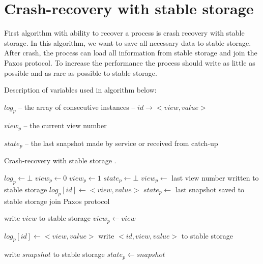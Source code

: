 \section{Crash-recovery with stable storage}
\label{sec:full_ss}

First algorithm with ability to recover a process is crash recovery with stable storage. In this algorithm, we want to save all necessary data to stable storage. After crash, the process can load all information from stable storage and join the Paxos protocol. \linebreak To increase the performance the process should write as little as possible and as rare as possible to stable storage.

Description of variables used in algorithm below:
\begin{tightList}[\setlength{\labelwidth}{20em} \setlength{\leftmargin}{2\leftmargin}]
  \item[$log_p$] -- the array of consecutive instances -- $id \rightarrow <view, value>$
  \item[$view_p$] -- the current view number
  \item[$state_p$] -- the last snapshot made by service or received from catch-up
\end{tightList}

\begin{algorithm}
  \caption{Crash-recovery with stable storage \protect\cite{Nun10}.}
  \begin{algorithmic}[1]
    \INIT{}
      \STATE $log_p \leftarrow \bot$ %
      \STATE $view_p \leftarrow 0$
        \STATE $view_p \leftarrow 1$
      \ENDIF
      \STATE $state_p \leftarrow \bot$ %
      \STATE
        \STATE $view_p \leftarrow$ last view number written to stable storage
          \STATE $log_p[id] \leftarrow <view, value>$
        \ENDFOR
        \STATE $state_p \leftarrow$ last snapshot saved to stable storage
      \ENDIF
      \STATE
      \STATE join Paxos protocol
    \ENDINIT

    \vspace{1em}
      \STATE write $view$ to stable storage
      \STATE $view_p \leftarrow view$
    \ENDPROC

    \vspace{1em}
      \STATE $log_p[id] \leftarrow <view, value>$
      \STATE write $<id, view, value>$ to stable storage
    \ENDPROC

    \vspace{1em}
      \STATE write $snapshot$ to stable storage
      \STATE $state_p \leftarrow snapshot$ 
    \ENDPROC
  \end{algorithmic}
\end{algorithm}

